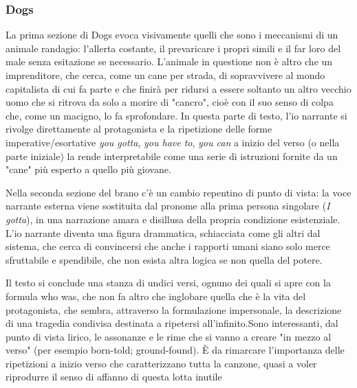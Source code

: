 \documentclass[class=book, crop=false, oneside, 12pt]{standalone}
\begin{document}
    \subsubsection{Dogs}
    La prima sezione di Dogs evoca visivamente quelli che sono i meccanismi di un animale randagio: l'allerta costante, il prevaricare i propri simili e il far loro del male senza esitazione se necessario. L'animale in questione non è altro che un imprenditore, che cerca, come un cane per strada, di sopravvivere al mondo capitalista di cui fa parte e che finirà per ridursi a essere soltanto un altro vecchio uomo che si ritrova da solo a morire di "cancro", cioè con il suo senso di colpa che, come un macigno, lo fa sprofondare. In questa parte di testo, l'io narrante si rivolge direttamente al protagonista e la ripetizione delle forme  imperative/esortative \emph{you gotta}, \emph{you have to}, \emph{you can} a inizio del verso (o nella parte iniziale) la rende interpretabile come una serie di istruzioni fornite da un "cane" più esperto a quello più giovane.

    Nella seconda sezione del brano c'è un cambio repentino di punto di vista: la voce narrante esterna viene sostituita dal pronome alla prima persona singolare (\emph{I gotta}), in una narrazione amara e disillusa della propria condizione esistenziale. L'io narrante diventa una figura drammatica, schiacciata come gli altri dal sistema, che cerca di convincersi che anche i rapporti umani siano solo merce sfruttabile e spendibile, che non esista altra logica se non quella del potere.

    Il testo si conclude una stanza di undici versi, ognuno dei quali si apre con la formula who was, che non fa altro che inglobare quella che è la vita del protagonista, che sembra, attraverso la formulazione impersonale, la descrizione di una tragedia condivisa destinata a ripetersi all'infinito.Sono interessanti, dal punto di vista lirico, le assonanze e le rime che si vanno a creare "in mezzo al verso" (per esempio born-told; ground-found). È da rimarcare l'importanza delle ripetizioni a inizio verso che caratterizzano tutta la canzone, quasi a voler riprodurre il senso di affanno di questa lotta inutile
\end{document}
